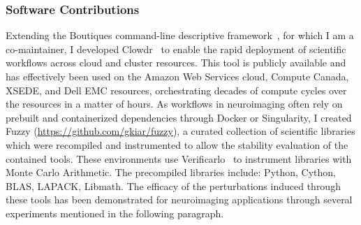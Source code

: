 \subsubsection*{Software Contributions}
Extending the Boutiques command-line descriptive framework~\cite{Glatard2018-tu}, for which I am a co-maintainer, I
developed Clowdr~\cite{Kiar2019-sr} to enable the rapid deployment of scientific workflows across cloud and cluster
resources. This tool is publicly available and has effectively been used on the Amazon Web Services cloud, Compute
Canada, XSEDE, and Dell  EMC resources, orchestrating decades of compute cycles over the resources in a matter of
hours. As workflows in neuroimaging often rely on prebuilt and containerized dependencies through Docker or
Singularity, I created Fuzzy (\href{https://github.com/gkiar/fuzzy}{https://github.com/gkiar/fuzzy}), a curated
collection of scientific libraries which were recompiled and instrumented to allow the stability evaluation of the
contained tools. These environments use Verificarlo~\cite{Denis2016-wo} to instrument libraries with Monte Carlo
Arithmetic. The precompiled libraries include: Python, Cython, BLAS, LAPACK, Libmath. The efficacy of the perturbations
induced through these tools has been demonstrated for neuroimaging applications through several experiments mentioned
in the following paragraph.


